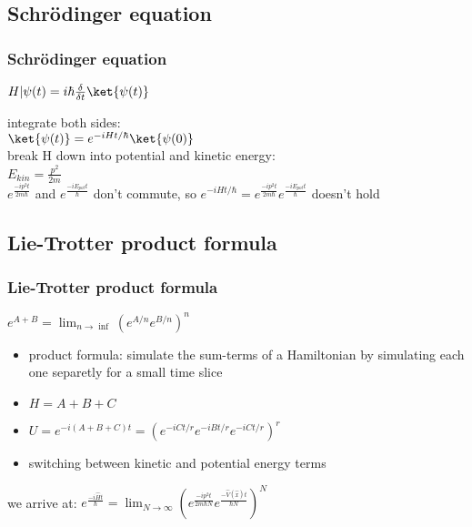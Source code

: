 \documentclass[10pt,a4paper]{beamer}
\begin{document}
\subsection{Schrödinger equation}
\begin{frame}
  \frametitle{Schrödinger equation} 
  \begin{Definition}
  $ H |\psi(t) = i \hbar \frac{\delta}{\delta t} \ket{\psi(t)} $
  \end{Definition}
  \vspace{0.21in}
  integrate both sides:\\
  \vspace{0.11in}
  \quad $ \ket{\psi(t)} = e^{-iHt/\hbar} \ket{\psi(0)}$\\
  \vspace{0.11in}
  break H down into potential and kinetic energy: \\
  \quad $E_{kin} = \frac{p^2}{2m}$ \\
  \vspace{0.11in}
  $e^{\frac{-ip^2t}{2m\hbar}}$ and $e^{\frac{-iE_{pot}t}{\hbar}}$ don't commute, so $ e^{-iHt/\hbar} = e^{\frac{-ip^2t}{2m\hbar}}e^{\frac{-iE_{pot}t}{\hbar}}$ doesn't hold
\end{frame}



\subsection{Lie-Trotter product formula}
\begin{frame}
  \frametitle{Lie-Trotter product formula}
  \begin{Definition}
  $ e^{A+B} = \lim_{n \to \inf}(e^{A/n}e^{B/n})^{n}  $
  \end{Definition}
  \begin{itemize}
  	\item product formula: simulate the sum-terms of a Hamiltonian by simulating each one separetly for a small time slice
  	\item $ H = A + B + C $
  	\item $ U = e ^ {-i(A+B+C)t} = (e^{-iCt/r}e^{-iBt/r}e^{-iCt/r})^{r} $
  	\item switching between kinetic and potential energy terms
  \end{itemize}
  we arrive at: $e^{\frac{-i\hat{H}t}{\hbar}} =  \lim_{N\to\infty} (e^{\frac{-ip^2t}{2m \hbar N}}e^{\frac{-\hat{V}(\hat{x})t}{\hbar N}})^N$
\end{frame}
\end{document}
